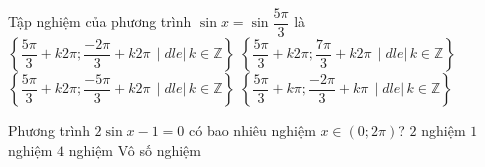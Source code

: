 \begin{ex}%
	Tập nghiệm của phương trình $\sin x = \sin \dfrac{5\pi}{3}$ là 
	 \choice
		{\True $\left\{ \dfrac{5\pi}{3} + k2\pi;  \dfrac{-2\pi}{3} + k2\pi \,\mid dle|\, k \in \mathbb{Z} \right\}$}
		{$\left\{ \dfrac{5\pi}{3} + k2\pi; \dfrac{7\pi}{3}  + k2\pi \,\mid dle|\, k \in \mathbb{Z} \right\}$}
		{$\left\{ \dfrac{5\pi}{3} + k2\pi; \dfrac{-5\pi}{3} + k2\pi \,\mid dle|\,  k \in \mathbb{Z} \right\}$}
		 {$\left\{ \dfrac{5\pi}{3} + k\pi; \dfrac{-2\pi}{3} + k\pi \,\mid dle|\, k \in \mathbb{Z} \right\}$}
\end{ex}

\begin{ex}%
	Phương trình $2 \sin x-1=0$ có  bao nhiêu nghiệm $x \in(0;2\pi)$?
	\choice 
		 {\True $2$ nghiệm}
		{$1$ nghiệm} 
		 {$4$ nghiệm}
		{Vô  số nghiệm}
\end{ex}

